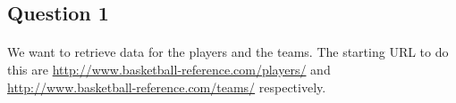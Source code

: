 
\subsection{Question 1}
\label{subsec:311}

\paragraph{} We want to retrieve data for the players and the teams. The starting URL to do this are \url{http://www.basketball-reference.com/players/} and \url{http://www.basketball-reference.com/teams/} respectively.